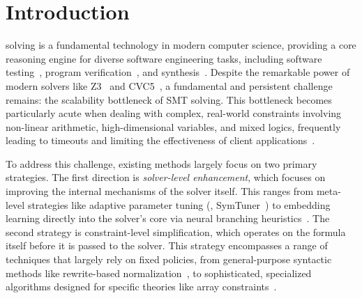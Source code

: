 \section{Introduction}


\SMT{} solving is a fundamental technology in modern computer science, providing a core reasoning engine for diverse software engineering tasks, including software testing~\cite{cadar2008klee}, program verification~\cite{ball2004slam}, and synthesis~\cite{reynolds2019refutation}. Despite the remarkable power of modern solvers like Z3~\cite{demoura2008z3} and CVC5~\cite{cvc5}, a fundamental and persistent challenge remains: the scalability bottleneck of SMT solving. This bottleneck becomes particularly acute when dealing with complex, real-world constraints involving non-linear arithmetic, high-dimensional variables, and mixed logics, frequently leading to timeouts and limiting the effectiveness of client applications~\cite{cadar2013symbolic}.

To address this challenge, existing methods largely focus on two primary strategies.
The first direction is \textit{solver-level enhancement}, which focuses on improving the internal mechanisms of the solver itself. This ranges from meta-level strategies like adaptive parameter tuning (\eg{}, SymTuner~\cite{chaSymTunerMaximizingPower2022}) to embedding learning directly into the solver's core via neural branching heuristics~\cite{kurin2020improving}. 
The second strategy is constraint-level simplification, which operates on the formula itself before it is passed to the solver. This strategy encompasses a range of techniques that largely rely on fixed policies, from general-purpose syntactic methods like rewrite-based normalization~\cite{willsey2021egg}, to sophisticated, specialized algorithms designed for specific theories like array constraints~\cite{liu2022optimal, shuai2021type}.

